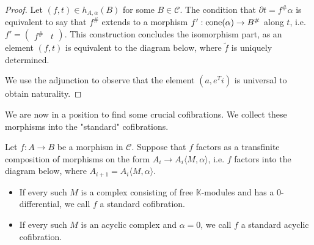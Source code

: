 \documentclass[../thesis.tex]{subfiles}
\begin{document}
            \begin{proof}
                Let $(f,t)\in h_{A,\alpha}(B)$ for some $B\in\mathcal{C}$. The condition that $\partial t = f^\#\alpha$ is equivalent to say that $f^\#$ extends to a morphism $f' : \tt{cone}(\alpha) \rightarrow B^\#$ along $t$, i.e. $f' = \begin{pmatrix}f^\# & t\end{pmatrix}$. This construction concludes the isomorphism part, as an element $(f,t)$ is equivalent to the diagram below, where $\widetilde{f}$ is uniquely determined.
                \begin{center}
                \end{center}
  
                We use the adjunction to observe that the element $(a, e^Ti)$ is universal to obtain naturality.
            \end{proof}

            We are now in a position to find some crucial cofibrations. We collect these morphisms into the "standard" cofibrations.

            \begin{definition}
                Let $f:A\rightarrow B$ be a morphism in $\mathcal{C}$. Suppose that $f$ factors as a transfinite composition of morphisms on the form $A_i \rightarrow A_i\langle M,\alpha\rangle$, i.e. $f$ factors into the diagram below, where $A_{i+1} = A_i\langle M,\alpha\rangle$.
                \begin{center}
                \end{center}
                \begin{itemize}
                    \item If every such $M$ is a complex consisting of free $\mathbb{K}$-modules and has a $0$-differential, we call $f$ a standard cofibration.
                    \item If every such $M$ is an acyclic complex and $\alpha = 0$, we call $f$ a standard acyclic cofibration.
                \end{itemize}
            \end{definition}
\end{document}
